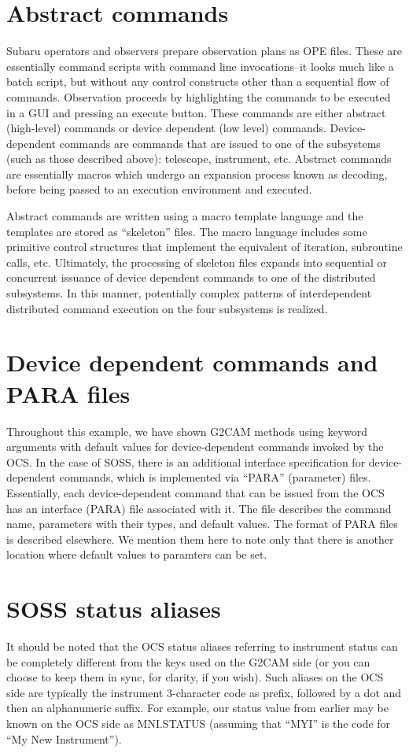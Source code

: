 \documentclass[11pt]{report}
\begin{document}
\section{Abstract commands}
Subaru operators and observers prepare observation plans as OPE
files. These are essentially command scripts with command line
invocations--it looks much like a batch script, but without any control
constructs other than a sequential flow of commands. Observation
proceeds by highlighting the commands to be executed in a GUI and
pressing an execute button. These commands are either abstract
(high-level) commands or device dependent (low level)
commands. Device-dependent commands are commands that are issued to one
of the subsystems (such as those described above): telescope,
instrument, etc. Abstract commands are essentially macros which undergo
an expansion process known as decoding, before being passed to an
execution environment and executed.

Abstract commands are written using a macro template language and the
templates are stored as ``skeleton'' files. The macro language includes
some primitive control structures that implement the equivalent of
iteration, subroutine calls, etc. Ultimately, the processing of skeleton
files expands into sequential or concurrent issuance of device dependent
commands to one of the distributed subsystems. In this manner,
potentially complex patterns of interdependent distributed command
execution on the four subsystems is realized. 

\section{Device dependent commands and PARA files}
Throughout this example, we have shown G2CAM methods using keyword
arguments with default values for device-dependent commands invoked by
the OCS. In the case of SOSS, there is an additional interface
specification for device-dependent commands, which is implemented via
``PARA'' (parameter) files. Essentially, each device-dependent command
that can be issued from the OCS has an interface (PARA) file associated
with it. The file describes the command name, parameters with their
types, and default values. The format of PARA files is described
elsewhere. We mention them here to note only that there is another
location where default values to paramters can be set. 

\section{SOSS status aliases}
It should be noted that the OCS status aliases referring to instrument
status can be completely different from the keys used on the G2CAM side
(or you can choose to keep them in sync, for clarity, if you wish). Such
aliases on the OCS side are typically the instrument 3-character code as
prefix, followed by a dot and then an alphanumeric suffix. For example,
our status value from earlier may be known on the OCS side as MNI.STATUS
(assuming that ``MYI'' is the code for ``My New Instrument'').  
\end{document}
